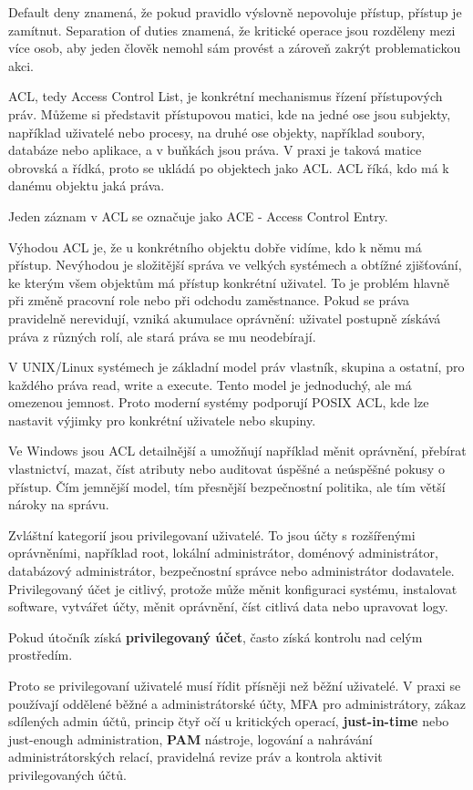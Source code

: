 \documentclass[11pt,a4paper]{article}
\begin{document}
Default deny znamená, že pokud pravidlo výslovně nepovoluje přístup, přístup je zamítnut. Separation of duties znamená, že kritické operace jsou rozděleny mezi více osob, aby jeden člověk nemohl sám provést a zároveň zakrýt problematickou akci.

ACL, tedy Access Control List, je konkrétní mechanismus řízení přístupových práv. Můžeme si představit přístupovou matici, kde na jedné ose jsou subjekty, například uživatelé nebo procesy, na druhé ose objekty, například soubory, databáze nebo aplikace, a v buňkách jsou práva. V praxi je taková matice obrovská a řídká, proto se ukládá po objektech jako ACL. ACL říká, kdo má k danému objektu jaká práva.

Jeden záznam v ACL se označuje jako ACE - Access Control Entry.

Výhodou ACL je, že u konkrétního objektu dobře vidíme, kdo k němu má přístup. Nevýhodou je složitější správa ve velkých systémech a obtížné zjišťování, ke kterým všem objektům má přístup konkrétní uživatel. To je problém hlavně při změně pracovní role nebo při odchodu zaměstnance. Pokud se práva pravidelně nerevidují, vzniká akumulace oprávnění: uživatel postupně získává práva z různých rolí, ale stará práva se mu neodebírají.

V UNIX/Linux systémech je základní model práv vlastník, skupina a ostatní, pro každého práva read, write a execute. Tento model je jednoduchý, ale má omezenou jemnost. Proto moderní systémy podporují POSIX ACL, kde lze nastavit výjimky pro konkrétní uživatele nebo skupiny.

Ve Windows jsou ACL detailnější a umožňují například měnit oprávnění, přebírat vlastnictví, mazat, číst atributy nebo auditovat úspěšné a neúspěšné pokusy o přístup. Čím jemnější model, tím přesnější bezpečnostní politika, ale tím větší nároky na správu.

Zvláštní kategorií jsou privilegovaní uživatelé. To jsou účty s rozšířenými oprávněními, například root, lokální administrátor, doménový administrátor, databázový administrátor, bezpečnostní správce nebo administrátor dodavatele. Privilegovaný účet je citlivý, protože může měnit konfiguraci systému, instalovat software, vytvářet účty, měnit oprávnění, číst citlivá data nebo upravovat logy.

Pokud útočník získá \textbf{privilegovaný účet}, často získá kontrolu nad celým prostředím.

Proto se privilegovaní uživatelé musí řídit přísněji než běžní uživatelé. V praxi se používají oddělené běžné a administrátorské účty, MFA pro administrátory, zákaz sdílených admin účtů, princip čtyř očí u kritických operací, \textbf{just-in-time} nebo just-enough administration, \textbf{PAM} nástroje, logování a nahrávání administrátorských relací, pravidelná revize práv a kontrola aktivit privilegovaných účtů.
\end{document}
